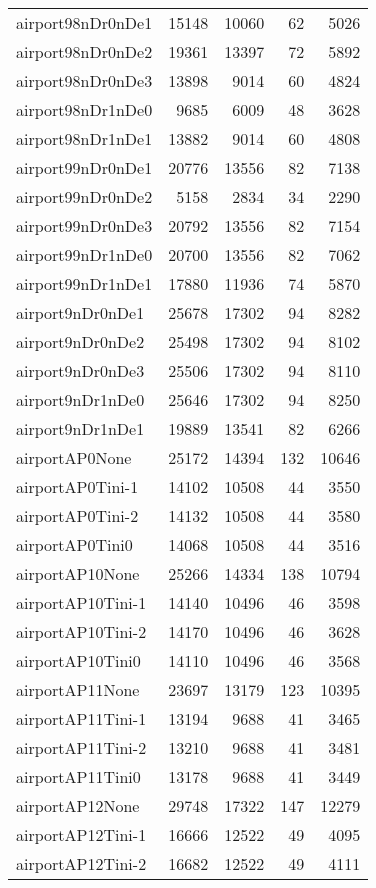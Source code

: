 \begin{longtable}{lrrrr}
airport98nDr0nDe1 & 15148 & 10060 & 62 & 5026 \\
airport98nDr0nDe2 & 19361 & 13397 & 72 & 5892 \\
airport98nDr0nDe3 & 13898 & 9014 & 60 & 4824 \\
airport98nDr1nDe0 & 9685 & 6009 & 48 & 3628 \\
airport98nDr1nDe1 & 13882 & 9014 & 60 & 4808 \\
airport99nDr0nDe1 & 20776 & 13556 & 82 & 7138 \\
airport99nDr0nDe2 & 5158 & 2834 & 34 & 2290 \\
airport99nDr0nDe3 & 20792 & 13556 & 82 & 7154 \\
airport99nDr1nDe0 & 20700 & 13556 & 82 & 7062 \\
airport99nDr1nDe1 & 17880 & 11936 & 74 & 5870 \\
airport9nDr0nDe1 & 25678 & 17302 & 94 & 8282 \\
airport9nDr0nDe2 & 25498 & 17302 & 94 & 8102 \\
airport9nDr0nDe3 & 25506 & 17302 & 94 & 8110 \\
airport9nDr1nDe0 & 25646 & 17302 & 94 & 8250 \\
airport9nDr1nDe1 & 19889 & 13541 & 82 & 6266 \\
airportAP0None & 25172 & 14394 & 132 & 10646 \\
airportAP0Tini-1 & 14102 & 10508 & 44 & 3550 \\
airportAP0Tini-2 & 14132 & 10508 & 44 & 3580 \\
airportAP0Tini0 & 14068 & 10508 & 44 & 3516 \\
airportAP10None & 25266 & 14334 & 138 & 10794 \\
airportAP10Tini-1 & 14140 & 10496 & 46 & 3598 \\
airportAP10Tini-2 & 14170 & 10496 & 46 & 3628 \\
airportAP10Tini0 & 14110 & 10496 & 46 & 3568 \\
airportAP11None & 23697 & 13179 & 123 & 10395 \\
airportAP11Tini-1 & 13194 & 9688 & 41 & 3465 \\
airportAP11Tini-2 & 13210 & 9688 & 41 & 3481 \\
airportAP11Tini0 & 13178 & 9688 & 41 & 3449 \\
airportAP12None & 29748 & 17322 & 147 & 12279 \\
airportAP12Tini-1 & 16666 & 12522 & 49 & 4095 \\
airportAP12Tini-2 & 16682 & 12522 & 49 & 4111 \\

\end{longtable}
